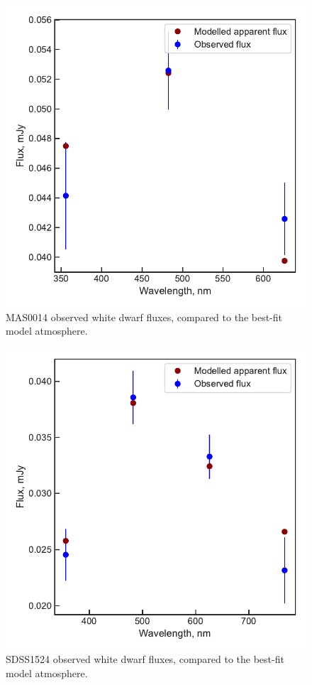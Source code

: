 \begin{figure}
    \centering
    \includegraphics[width=\textwidth]{figures/results/MASOT0014/fluxplot.pdf}
    \caption{MAS0014 observed white dwarf fluxes, compared to the best-fit model atmosphere.}
    \label{fig:MAS0014 flux plot}
\end{figure}

\begin{figure}
    \centering
    \includegraphics[width=\textwidth]{figures/results/SDSS1524/fluxplot.pdf}
    \caption{SDSS1524 observed white dwarf fluxes, compared to the best-fit model atmosphere.}
    \label{fig:SDSS1524 flux plot}
\end{figure}


